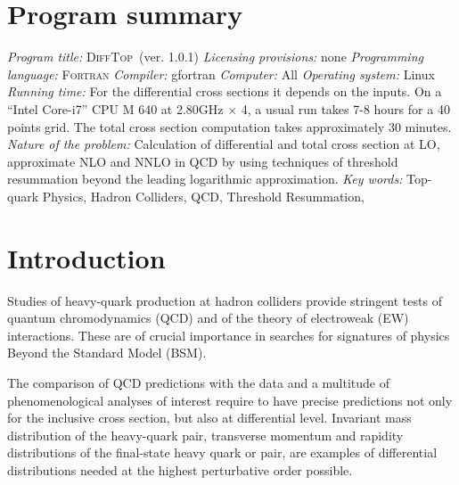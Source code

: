 \documentclass[11pt]{article}
\begin{document}
\section{Program summary}\label{sec:Program summary}

{\it Program title:} \textsc{DiffTop}~(ver. 1.0.1)
\newline
{\it Licensing provisions:} none
\newline
{\it Programming language:} \textsc{Fortran}
\newline
{\it Compiler:} gfortran 
\newline
{\it Computer:} All 
\newline
{\it Operating system:} Linux 
\newline
{\it Running time:} For the differential cross sections it depends on the inputs. 
On a ``Intel Core-i7'' CPU M 640 at 2.80GHz $\times$ 4, a usual run takes 7-8 hours for a 40 points grid. 
The total cross section computation takes approximately 30 minutes. 
\newline
{\it Nature of the problem:} Calculation of differential and total cross section at LO, 
approximate NLO and NNLO in QCD by using techniques of threshold resummation beyond the leading logarithmic approximation.
\newline
{\it Key words:} Top-quark Physics, Hadron Colliders, QCD, Threshold Resummation, 


\section{Introduction}\label{sec:kinem-cross-sect}

Studies of heavy-quark production at hadron colliders provide stringent tests of quantum chromodynamics 
(QCD) and of the theory of electroweak (EW) interactions. These are of crucial 
importance in searches for signatures of physics Beyond the Standard Model (BSM).

The comparison of QCD predictions with the data and a multitude of phenomenological analyses of interest  
require to have precise predictions not only for the inclusive cross section, but also at differential level. 
Invariant mass distribution of the heavy-quark pair, transverse momentum and rapidity distributions of the final-state 
heavy quark or pair, are examples of differential distributions needed at the highest perturbative order possible. 
\end{document}
